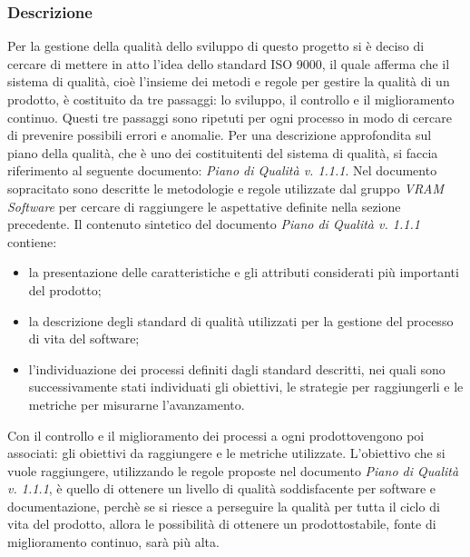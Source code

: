 \subsubsection{Descrizione}
Per la gestione della qualità dello sviluppo di questo progetto si è deciso di cercare di mettere in atto l'idea dello standard ISO 9000, il quale afferma che il sistema di qualità, cioè l'insieme dei metodi e regole per gestire la qualità di un prodotto\glo, è costituito da tre passaggi: lo sviluppo, il controllo e il miglioramento continuo. Questi tre passaggi sono ripetuti per ogni processo in modo di cercare di prevenire possibili errori e anomalie.
Per una descrizione approfondita sul piano della qualità, che è uno dei costituitenti del sistema di qualità, si faccia riferimento al seguente documento: \textit{Piano di Qualità v. 1.1.1}.
Nel documento sopracitato sono descritte le metodologie e regole utilizzate dal gruppo \textit{VRAM Software} per cercare di raggiungere le aspettative definite nella sezione precedente.
Il contenuto sintetico del documento \textit{Piano di Qualità v. 1.1.1} contiene:
\begin{itemize}
	\item la presentazione delle caratteristiche e gli attributi considerati più importanti del prodotto\glo;
	\item la descrizione degli standard di qualità utilizzati per la gestione del processo di vita del software;
	\item l'individuazione dei processi definiti dagli standard descritti, nei quali sono successivamente stati individuati gli obiettivi, le strategie per raggiungerli e le metriche per misurarne l'avanzamento.
\end{itemize}
Con il controllo e il miglioramento dei processi a ogni prodotto\glosp vengono poi associati: gli obiettivi da raggiungere e le metriche utilizzate.
L'obiettivo che si vuole raggiungere, utilizzando le regole proposte nel documento \textit{Piano di Qualità v. 1.1.1}, è quello di ottenere un livello di qualità soddisfacente per software e documentazione, perchè se si riesce a perseguire la qualità per tutta il ciclo di vita del prodotto\glo, allora le possibilità di ottenere un prodotto\glosp stabile, fonte di miglioramento continuo, sarà più alta.
